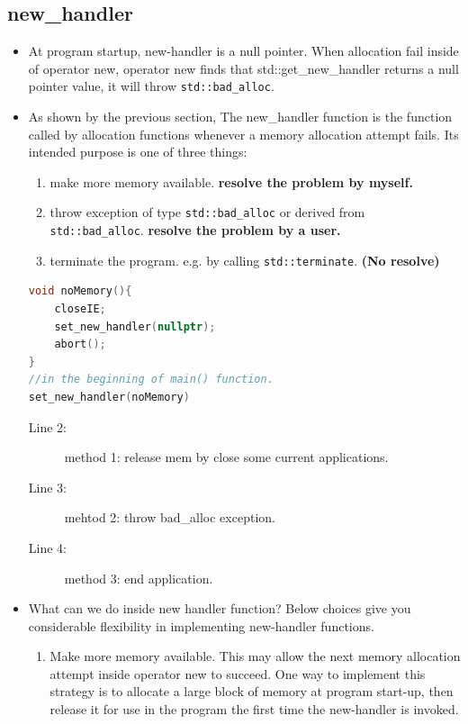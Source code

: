 \documentclass[a4paper,11pt,twoside]{book}
\begin{document}
\subsection{new\_handler}
\begin{itemize}
	\item At program startup, new-handler is a null pointer. When allocation fail inside of operator new, operator new finds that std::get\_new\_handler returns a null pointer value, it will throw \texttt{std::bad\_alloc}.
	
	\item  As shown by the previous section, The new\_handler function is the function called by allocation functions whenever a memory allocation attempt fails. Its intended purpose is one of three things:
	
	\begin{enumerate}
		\item make more memory available. \textbf{resolve the problem by myself.}
		
		\item throw exception of type \texttt{std::bad\_alloc} or derived from \texttt{std::bad\_alloc}. \textbf{resolve the problem by a user.}
		
		\item terminate the program. e.g. by calling \texttt{std::terminate}. \textbf{(No resolve)}
	\end{enumerate}
	
\begin{lstlisting}[frame=single, language=c++]
void noMemory(){
	closeIE; 
	set_new_handler(nullptr); 
	abort();  
}
//in the beginning of main() function.
set_new_handler(noMemory)
\end{lstlisting}
\begin{description}
	\item[Line 2: ] method 1: release mem by close some current applications.
	\item[Line 3: ] mehtod 2: throw bad\_alloc exception.
	\item[Line 4: ] method 3: end application.
\end{description}
	
	\item What can we do inside new handler function? Below choices give you considerable flexibility in implementing new-handler functions.
	\begin{enumerate}
		
		\item Make more memory available. This may allow the next memory allocation attempt inside operator new to succeed. One way to implement this strategy is to allocate a large block of memory at program start-up, then release it for use in the program the first time the new-handler is invoked.
		

\end{enumerate}
\end{itemize}
\end{document}
